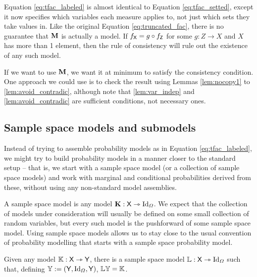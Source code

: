 Equation \ref{eq:tfac_labeled} is almost identical to Equation \ref{eq:tfac_setted}, except it now specifies which variables each measure applies to, not just which sets they take values in. Like the original Equation \ref{eq:truncated_fac}, there is no guarantee that $\mathbf{M}$ is actually a model. If $f_{\mathsf{X}}=g\circ f_{\mathsf{Z}}$ for some $g:Z\to X$ and $X$ has more than 1 element, then the rule of consistency will rule out the existence of any such model.

If we want to use $\mathbf{M}$, we want it at minimum to satisfy the consistency condition. One approach we could use is to check the result using Lemmas \ref{lem:nocopy1} to \ref{lem:avoid_contradic}, although note that \ref{lem:var_indep} and \ref{lem:avoid_contradic} are sufficient conditions, not necessary ones.

\subsection{Sample space models and submodels}

Instead of trying to assemble probability models as in Equation \ref{eq:tfac_labeled}, we might try to build probability models in a manner closer to the standard setup -- that is, we start with a sample space model (or a collection of sample space models) and work with marginal and conditional probabilities derived from these, without using any non-standard model assemblies.

A sample space model is any model $\mathbf{K}:\mathsf{X}\rightarrowtriangle \text{Id}_\Omega$. We expect that the collection of models under consideration will usually be defined on some small collection of random variables, but every such model is the pushforward of some sample space model. Using sample space models allows us to stay close to the usual convention of probability modelling that starts with a sample space probability model.

\begin{lemma}\label{lem:ss_exist}
Given any model $\mathbb{K}:\mathsf{X}\rightarrowtriangle \mathsf{Y}$, there is a sample space model $\mathbb{L}:\mathsf{X}\rightarrowtriangle\text{Id}_\Omega$ such that, defining $\mathbb{Y}:=(\mathsf{Y},\text{Id}_\Omega,\mathsf{Y})$, $\mathbb{L}\mathbb{Y}=\mathbb{K}$.
\end{lemma}

